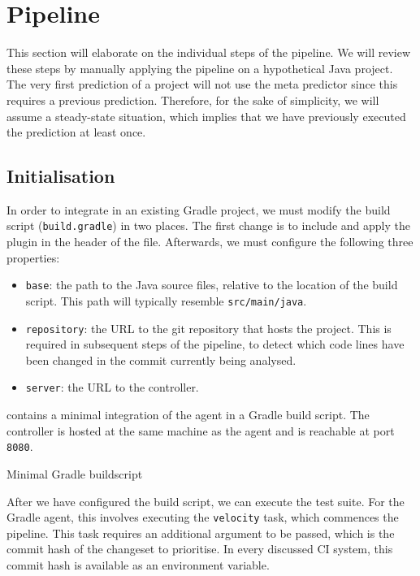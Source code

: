 
\section{Pipeline}
\label{sec:velocity-pipeline}
This section will elaborate on the individual steps of the pipeline. We will review these steps by manually applying the pipeline on a hypothetical Java project. The very first prediction of a project will not use the meta predictor since this requires a previous prediction. Therefore, for the sake of simplicity, we will assume a steady-state situation, which implies that we have previously executed the prediction at least once.

\subsection{Initialisation}\label{ssec:pipeline-initialisation}
In order to integrate \velocity{} in an existing Gradle project, we must modify the build script (\texttt{build.gradle}) in two places. The first change is to include and apply the plugin in the header of the file. Afterwards, we must configure the following three properties:
\begin{itemize}
	\item \texttt{base}: the path to the Java source files, relative to the location of the build script. This path will typically resemble \texttt{src/main/java}.
	
	\item \texttt{repository}: the URL to the git repository that hosts the project. This is required in subsequent steps of the pipeline, to detect which code lines have been changed in the commit currently being analysed.
	
	\item \texttt{server}: the URL to the controller.
\end{itemize}

\noindent {} contains a minimal integration of the agent in a Gradle build script. The controller is hosted at the same machine as the agent and is reachable at port \texttt{8080}.

\begin{listing}
	
	\caption{Minimal Gradle buildscript}
	\label{lst:pipeline-buildgradle}
\end{listing}

\noindent After we have configured the build script, we can execute the test suite. For the Gradle agent, this involves executing the \texttt{velocity} task, which commences the pipeline. This task requires an additional argument to be passed, which is the commit hash of the changeset to prioritise. In every discussed CI system, this commit hash is available as an environment variable.\\


